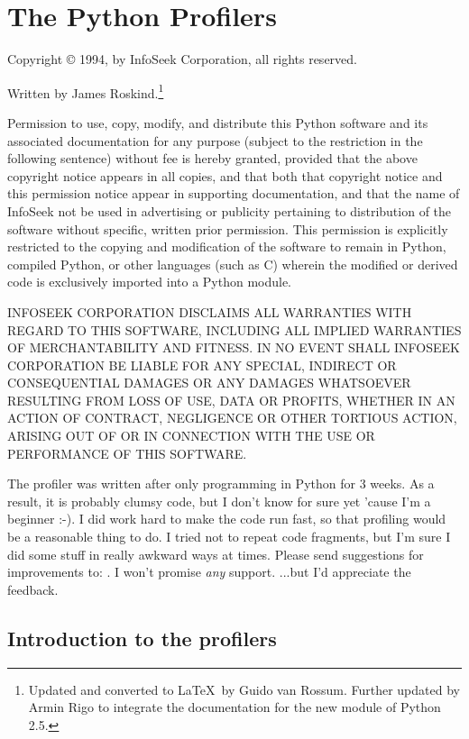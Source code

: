 \chapter{The Python Profilers \label{profile}}


Copyright \copyright{} 1994, by InfoSeek Corporation, all rights reserved.

Written by James Roskind.\footnote{
  Updated and converted to \LaTeX\ by Guido van Rossum.
  Further updated by Armin Rigo to integrate the documentation for the new
   module of Python 2.5.}

Permission to use, copy, modify, and distribute this Python software
and its associated documentation for any purpose (subject to the
restriction in the following sentence) without fee is hereby granted,
provided that the above copyright notice appears in all copies, and
that both that copyright notice and this permission notice appear in
supporting documentation, and that the name of InfoSeek not be used in
advertising or publicity pertaining to distribution of the software
without specific, written prior permission.  This permission is
explicitly restricted to the copying and modification of the software
to remain in Python, compiled Python, or other languages (such as C)
wherein the modified or derived code is exclusively imported into a
Python module.

INFOSEEK CORPORATION DISCLAIMS ALL WARRANTIES WITH REGARD TO THIS
SOFTWARE, INCLUDING ALL IMPLIED WARRANTIES OF MERCHANTABILITY AND
FITNESS. IN NO EVENT SHALL INFOSEEK CORPORATION BE LIABLE FOR ANY
SPECIAL, INDIRECT OR CONSEQUENTIAL DAMAGES OR ANY DAMAGES WHATSOEVER
RESULTING FROM LOSS OF USE, DATA OR PROFITS, WHETHER IN AN ACTION OF
CONTRACT, NEGLIGENCE OR OTHER TORTIOUS ACTION, ARISING OUT OF OR IN
CONNECTION WITH THE USE OR PERFORMANCE OF THIS SOFTWARE.


The profiler was written after only programming in Python for 3 weeks.
As a result, it is probably clumsy code, but I don't know for sure yet
'cause I'm a beginner :-).  I did work hard to make the code run fast,
so that profiling would be a reasonable thing to do.  I tried not to
repeat code fragments, but I'm sure I did some stuff in really awkward
ways at times.  Please send suggestions for improvements to:
.  I won't promise \emph{any} support.  ...but
I'd appreciate the feedback.


\section{Introduction to the profilers}

